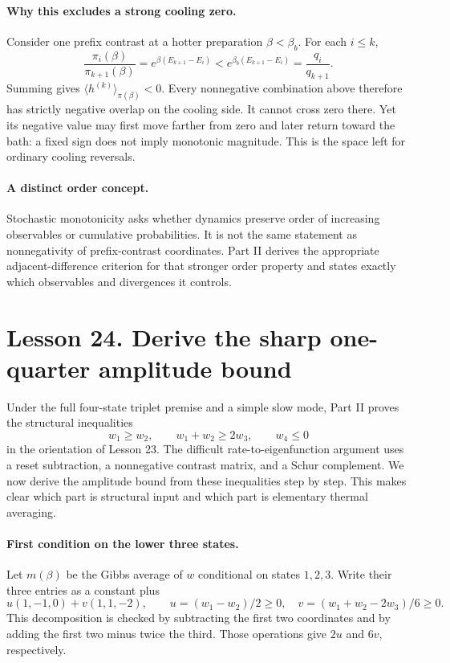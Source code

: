 \paragraph{Why this excludes a strong cooling zero.}
Consider one prefix contrast at a hotter preparation $\beta<\beta_b$.
For each $i\leq k$,
\[
\frac{\pi_i(\beta)}{\pi_{k+1}(\beta)}
=e^{\beta(E_{k+1}-E_i)}
<e^{\beta_b(E_{k+1}-E_i)}=\frac{q_i}{q_{k+1}}.
\]
Summing gives $\langle h^{(k)}\rangle_{\pi(\beta)}<0$.
Every nonnegative combination above therefore has strictly negative
overlap on the cooling side. It cannot cross zero there. Yet its negative
value may first move farther from zero and later return toward the bath:
a fixed sign does not imply monotonic magnitude. This is the space left
for ordinary cooling reversals.

\paragraph{A distinct order concept.}
Stochastic monotonicity asks whether dynamics preserve order of increasing
observables or cumulative probabilities. It is not the same statement as
nonnegativity of prefix-contrast coordinates. Part II derives the
appropriate adjacent-difference criterion for that stronger order property
and states exactly which observables and divergences it controls.

\clearpage
\section*{Lesson 24. Derive the sharp one-quarter amplitude bound}
Under the full four-state triplet premise and a simple slow mode, Part II
proves the structural inequalities
\[
w_1\geq w_2,\qquad w_1+w_2\geq2w_3,\qquad w_4\leq0
\]
in the orientation of Lesson 23. The difficult rate-to-eigenfunction
argument uses a reset subtraction, a nonnegative contrast matrix, and a
Schur complement. We now derive the amplitude bound from these inequalities
step by step. This makes clear which part is structural input and which
part is elementary thermal averaging.

\paragraph{First condition on the lower three states.}
Let $m(\beta)$ be the Gibbs average of $w$ conditional on states $1,2,3$.
Write their three entries as a constant plus
\[
u(1,-1,0)+v(1,1,-2),\qquad
u=(w_1-w_2)/2\geq0,\quad
v=(w_1+w_2-2w_3)/6\geq0.
\]
This decomposition is checked by subtracting the first two coordinates
and by adding the first two minus twice the third. Those operations give
$2u$ and $6v$, respectively.

